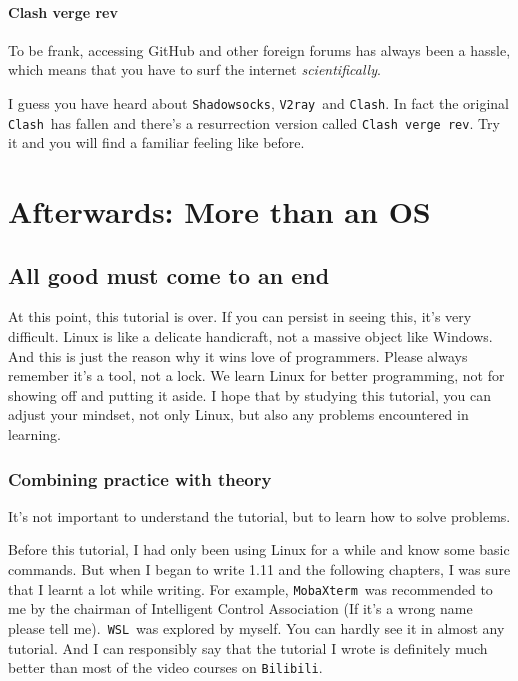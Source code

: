\documentclass[12pt]{ctexart}
\begin{document}
\paragraph{\textbf{Clash verge rev}}

To be frank, accessing GitHub and other foreign forums has always been a
hassle, which means that you have to surf the internet
\emph{scientifically}.

I guess you have heard about \texttt{Shadowsocks}, \texttt{V2ray}\ and
\texttt{Clash}. In fact the original \texttt{Clash}\ has fallen and
there's a resurrection version called
\texttt{Clash\ verge\ rev}. Try it and you will find a familiar feeling
like before.

\newpage
\titleformat{\section}[block]{\normalfont\Large\bfseries\centering}{}{0pt}{}
\section*{\textbf{Afterwards: More than an OS}}

\subsection*{\textbf{All good must come to an end}}

At this point, this tutorial is over. If you can persist in seeing this,
it's very difficult. Linux is like a delicate
handicraft, not a massive object like Windows. And this is just the
reason why it wins love of programmers. Please always remember
it's a tool, not a lock. We learn Linux for better
programming, not for showing off and putting it aside. I hope that by
studying this tutorial, you can adjust your mindset, not only Linux, but
also any problems encountered in learning.

\subsubsection*{\textbf{Combining practice with theory}}

It's not important to understand the tutorial, but to
learn how to solve problems.

Before this tutorial, I had only been using Linux for a while and know
some basic commands. But when I began to write 1.11 and the following
chapters, I was sure that I learnt a lot while writing. For example,
\texttt{MobaXterm}\ was recommended to me by the chairman of Intelligent
Control Association (If it's a wrong name please tell
me).\ \texttt{WSL}\ was explored by myself. You can hardly see it in
almost any tutorial. And I can responsibly say that the tutorial I wrote
is definitely much better than most of the video courses on
\texttt{Bilibili}.
\end{document}
